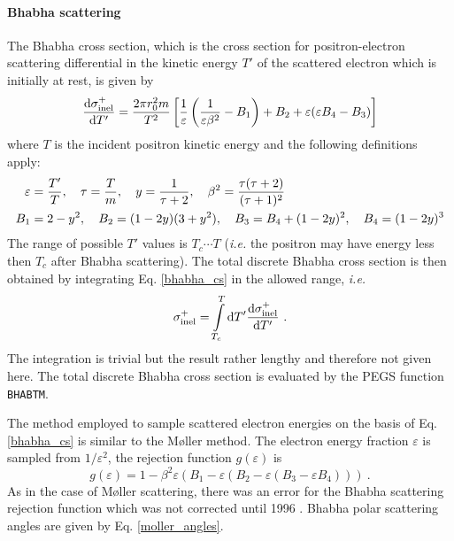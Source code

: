 \paragraph{Bhabha scattering} \hfill
{}

The Bhabha cross section, which is the cross section
for positron-electron scattering differential in the kinetic energy
$T'$ of the scattered electron which is initially at rest, is 
given by \cite{Ne85}
\begin{equation}
\label{bhabha_cs}
{{\rm d} \sigma_{\rm inel}^+ \over  {\rm d}T'} = 
{2 \pi r_0^2 m \over T^2} \left[ \frac{1}{\varepsilon}\left( 
{1 \over \varepsilon \beta^2} - B_1 \right) + B_2 + \varepsilon 
(\varepsilon B_4 - B_3 ) \right]
\end{equation} 
where $T$ is the incident positron kinetic energy and 
the following definitions apply:
\begin{equation}
\label{vhabha_cs1}
\begin{split}
\varepsilon & = \frac{T'}{T}, \quad \tau = \frac{T}{m}, 
\quad y = {1 \over \tau + 2}, \quad \beta^2 = {\tau (\tau + 2) \over 
(\tau + 1)^2} \\
B_1 &= 2 - y^2, \quad B_2 = (1 - 2 y)(3 + y^2), \quad B_3 = B_4 + 
(1 - 2 y)^2, \quad B_4 = (1 - 2 y)^3
\end{split}
\end{equation}
The range of possible $T'$ values is $T_c \cdots T$ 
({\em i.e.} the positron may have energy less then $T_c$ 
after Bhabha scattering). 
The total discrete Bhabha cross section is then obtained 
by integrating Eq. \eqref{bhabha_cs} in the allowed range, 
{\em i.e.} 
\begin{equation}
\sigma_{\rm inel}^+ = \int\limits_{T_c}^T {\rm d}T' 
{{\rm d} \sigma_{\rm inel}^+ \over  {\rm d}T'}~.
\end{equation}
The integration is trivial but the result rather lengthy and therefore not 
given here. The total discrete Bhabha cross section is evaluated 
by the PEGS function {\tt BHABTM}.

The method employed to sample scattered electron energies on the basis 
of Eq. \eqref{bhabha_cs} is similar to the M{\o}ller method. 
The electron energy fraction $\varepsilon$ is sampled from 
$1/\varepsilon^2$, the rejection function $g(\varepsilon)$ is 
\begin{equation}
g(\varepsilon) = 1 - \beta^2 \varepsilon (B_1 - \varepsilon (B_2 
- \varepsilon (B_3 - \varepsilon B_4)))~.
\end{equation}
As in the case of M{\o}ller scattering, there was an error for 
the Bhabha scattering rejection function which was not corrected 
until 1996 \cite{Bi96b}. Bhabha polar scattering angles are 
given by Eq. \eqref{moller_angles}. 

